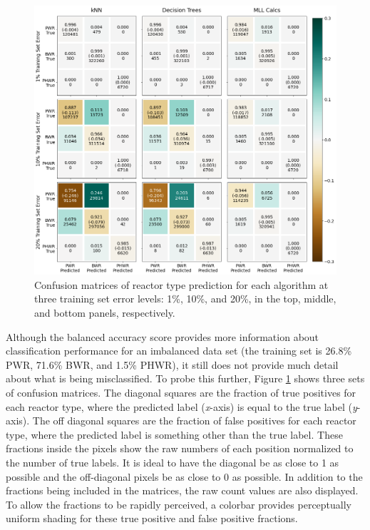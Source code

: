 \begin{figure}[!htb]
  \centering
  \includegraphics[width=\textwidth]{./chapters/exp1/confusion_matrix_nuc29_3errs.png}
  \caption[Confusion matrices of reactor type classification]
          {Confusion matrices of reactor type prediction for each algorithm 
           at three training set error levels: 1\%, 10\%, and 20\%, in the 
           top, middle, and bottom panels, respectively.}
  \label{fig:cm_nuc29}
\end{figure}

Although the balanced accuracy score provides more information about
classification performance for an imbalanced data set (the training set is
26.8\% \gls{PWR}, 71.6\% \gls{BWR}, and 1.5\% \gls{PHWR}), it still does not
provide much detail about what is being misclassified. To probe this further,
Figure \ref{fig:cm_nuc29} shows three sets of confusion matrices.  The diagonal
squares are the fraction of true positives for each reactor type, where the
predicted label (\textit{x}-axis) is equal to the true label (\textit{y}-axis).
The off diagonal squares are the fraction of false positives for each reactor
type, where the predicted label is something other than the true label.  These
fractions inside the pixels show the raw numbers of each position normalized to
the number of true labels.  It is ideal to have the diagonal be as close to 1
as possible and the off-diagonal pixels be as close to 0 as possible.  In
addition to the fractions being included in the matrices, the raw count values
are also displayed. To allow the fractions to be rapidly perceived, a colorbar
provides perceptually uniform shading for these true positive and false
positive fractions. 

